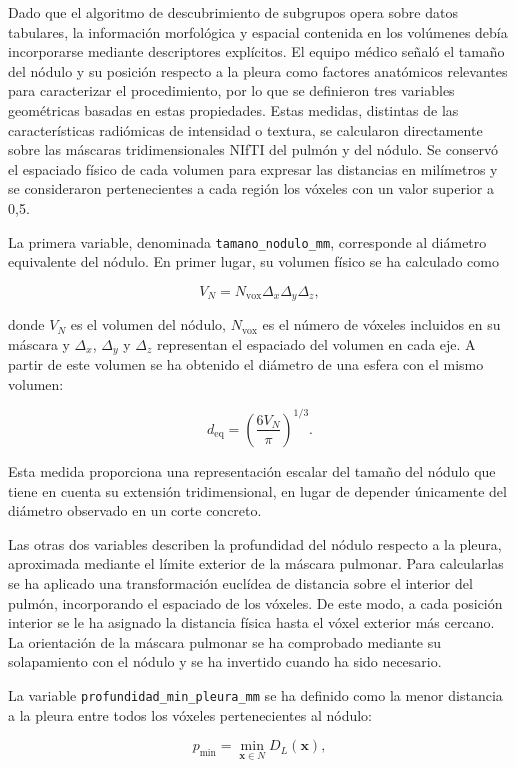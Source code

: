 Dado que el algoritmo de descubrimiento de subgrupos opera sobre datos tabulares, la información morfológica y espacial contenida en los volúmenes debía incorporarse mediante descriptores explícitos. El equipo médico señaló el tamaño del nódulo y su posición respecto a la pleura como factores anatómicos relevantes para caracterizar el procedimiento, por lo que se definieron tres variables geométricas basadas en estas propiedades. Estas medidas, distintas de las características radiómicas de intensidad o textura, se calcularon directamente sobre las máscaras tridimensionales NIfTI del pulmón y del nódulo. Se conservó el espaciado físico de cada volumen para expresar las distancias en milímetros y se consideraron pertenecientes a cada región los vóxeles con un valor superior a 0,5.

La primera variable, denominada \texttt{tamano\_nodulo\_mm}, corresponde al diámetro equivalente del nódulo. En primer lugar, su volumen físico se ha calculado como

\[
V_N =
N_{\mathrm{vox}}
\Delta_x \Delta_y \Delta_z,
\]

donde \(V_N\) es el volumen del nódulo, \(N_{\mathrm{vox}}\) es el número de vóxeles incluidos en su máscara y \(\Delta_x\), \(\Delta_y\) y \(\Delta_z\) representan el espaciado del volumen en cada eje. A partir de este volumen se ha obtenido el diámetro de una esfera con el mismo volumen:

\[
d_{\mathrm{eq}} =
\left(
\frac{6V_N}{\pi}
\right)^{1/3}.
\]

Esta medida proporciona una representación escalar del tamaño del nódulo que tiene en cuenta su extensión tridimensional, en lugar de depender únicamente del diámetro observado en un corte concreto.

Las otras dos variables describen la profundidad del nódulo respecto a la pleura, aproximada mediante el límite exterior de la máscara pulmonar. Para calcularlas se ha aplicado una transformación euclídea de distancia sobre el interior del pulmón, incorporando el espaciado de los vóxeles. De este modo, a cada posición interior se le ha asignado la distancia física hasta el vóxel exterior más cercano. La orientación de la máscara pulmonar se ha comprobado mediante su solapamiento con el nódulo y se ha invertido cuando ha sido necesario.

La variable \texttt{profundidad\_min\_pleura\_mm} se ha definido como la menor distancia a la pleura entre todos los vóxeles pertenecientes al nódulo:

\[
p_{\min}
=
\min_{\mathbf{x}\in N} D_L(\mathbf{x}),
\]

